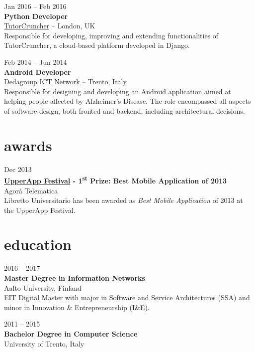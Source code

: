 \documentclass[]{friggeri-cv}
\begin{document}
{Jan 2016 -- Feb 2016} \\
{\textbf{Python Developer}} \\
{\href{http://www.tutorcruncher.com}{TutorCruncher}} -- {London, UK} \\
{Responsible for developing, improving and extending functionalities of TutorCruncher, a cloud-based platform developed in Django.}

{Feb 2014 -- Jun 2014} \\
{\textbf{Android Developer}} \\
{\href{http://www.dedagroup.it}{Dedagroup ICT Network}} -- {Trento, Italy} \\
{Responsible for designing and developing an Android application aimed at helping people affected by Alzheimer's Disease. The role encompassed all aspects of software design, both fronted and backend, including architectural decisions.}


\section{awards}

{Dec 2013} \\
{\textbf{\href{http://www.upperapp.it}{UpperApp Festival} - 1\textsuperscript{st} Prize: Best Mobile Application of 2013} \\
{Agorà Telematica} \\
Libretto Universitario has been awarded as \textit{Best Mobile Application} of 2013 at the UpperApp Festival.}


\section{education}

{2016 -- 2017} \\
\textbf{Master Degree {\normalfont in Information Networks}} \\
{Aalto University, Finland} \\
{EIT Digital Master with major in Software and Service Architectures (SSA) and minor in Innovation \& Entrepreneurship (I\&E).}

{2011 -- 2015} \\
\textbf{Bachelor Degree {\normalfont in Computer Science}} \\
{University of Trento, Italy}
\end{document}
